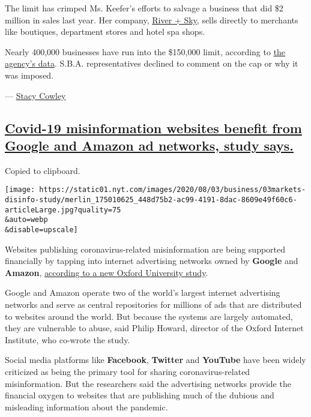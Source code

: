 The limit has crimped Ms. Keefer's efforts to salvage a business that
did \$2 million in sales last year. Her company,
\href{https://www.riverandskycalifornia.com/}{River + Sky}, sells
directly to merchants like boutiques, department stores and hotel spa
shops.

Nearly 400,000 businesses have run into the \$150,000 limit, according
to
\href{https://www.sba.gov/funding-programs/loans/coronavirus-relief-options/economic-injury-disaster-loans\#section-header-5}{the
agency's data}. S.B.A. representatives declined to comment on the cap or
why it was imposed.

--- \href{https://www.nytimes.com/by/stacy-cowley}{Stacy Cowley}

\hypertarget{covid-19-misinformation-websites-benefit-from-google-and-amazon-ad-networks-study-says}{%
\subsection{\texorpdfstring{\protect\hyperlink{covid-19-misinformation-websites-benefit-from-google-and-amazon-ad-networks-study-says}{Covid-19
misinformation websites benefit from Google and Amazon ad networks,
study
says.}}{Covid-19 misinformation websites benefit from Google and Amazon ad networks, study says.}}\label{covid-19-misinformation-websites-benefit-from-google-and-amazon-ad-networks-study-says}}

Copied to clipboard.

\texttt{[image: https://static01.nyt.com/images/2020/08/03/business/03markets-disinfo-study/merlin\_175010625\_448d75b2-ac99-4191-8dac-8609e49f60c6-articleLarge.jpg?quality=75\\\&auto=webp\\\&disable=upscale]}

Websites publishing coronavirus-related misinformation are being
supported financially by tapping into internet advertising networks
owned by \textbf{Google} and \textbf{Amazon},
\href{https://comprop.oii.ox.ac.uk/research/covid19-disinfo-seo/}{according
to a new Oxford University study}.

Google and Amazon operate two of the world's largest internet
advertising networks and serve as central repositories for millions of
ads that are distributed to websites around the world. But because the
systems are largely automated, they are vulnerable to abuse, said Philip
Howard, director of the Oxford Internet Institute, who co-wrote the
study.

Social media platforms like \textbf{Facebook}, \textbf{Twitter} and
\textbf{YouTube} have been widely criticized as being the primary tool
for sharing coronavirus-related misinformation. But the researchers said
the advertising networks provide the financial oxygen to websites that
are publishing much of the dubious and misleading information about the
pandemic.

